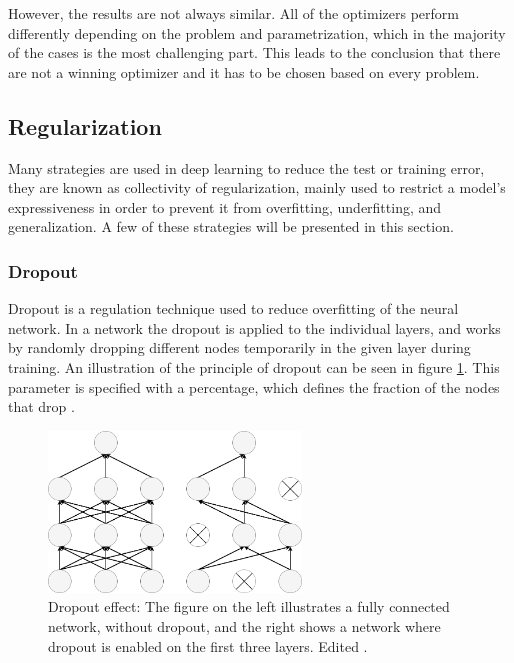 \noindent
However, the results are not always similar. All of the optimizers perform differently depending on the problem and parametrization, which in the majority of the cases is the most challenging part. This leads to the conclusion that there are not a winning optimizer and it has to be chosen based on every problem.\citep{Int82016}



\subsection{Regularization}
Many strategies are used in deep learning to reduce the test or training error, they are known as collectivity of regularization\citep{Goodfellow2016}, mainly used to restrict a model's expressiveness in order to prevent it from overfitting, underfitting, and generalization. A few of these strategies will be presented in this section.

\subsubsection{Dropout}\label{sec:dropout}
Dropout is a regulation technique used to reduce overfitting of the neural network. In a network the dropout is applied to the individual layers, and works by randomly dropping different nodes temporarily in the given layer during training. An illustration of the principle of dropout can be seen in figure \ref{fig:Dropout}. This parameter is specified with a percentage, which defines the fraction of the nodes that drop \citep{Chollet2015}.

\begin{figure} [H]
\centering
\includegraphics[width=0.6\textwidth]{figures/Dropout}
\caption{Dropout effect: The figure on the left illustrates a fully connected network, without dropout, and the right shows a network where dropout is enabled on the first three layers. Edited \citep{Srivastava2014}.}
\label{fig:Dropout} 
\end{figure}

